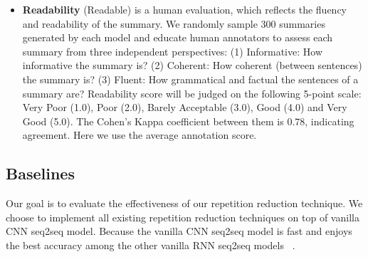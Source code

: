 \begin{itemize}
\item \textbf{Readability} (Readable) is a human evaluation,
which reflects the fluency and readability of the summary.
We randomly sample 300 summaries generated by each model
and educate human annotators to assess each summary
from three independent perspectives: 
(1) Informative: How informative the summary is? 
(2) Coherent: How coherent (between sentences) the summary is? 
(3) Fluent: How grammatical and factual the sentences of a summary are? 
Readability score will be judged on the following 5-point scale:
Very Poor (1.0), Poor (2.0), Barely Acceptable (3.0), Good (4.0) and Very Good (5.0).
The Cohen's Kappa coefficient between them is $0.78$, 
indicating agreement. Here we use the average annotation score.
\end{itemize}


\subsection{Baselines}
Our goal is to evaluate the
effectiveness of our repetition reduction technique.
We choose to implement 
all existing repetition reduction techniques on top of vanilla CNN seq2seq model.
Because the vanilla CNN seq2seq model is fast and enjoys the best accuracy among
the other vanilla RNN seq2seq models 
~\cite{bai2018empirical,gehring2017convs2s}.



